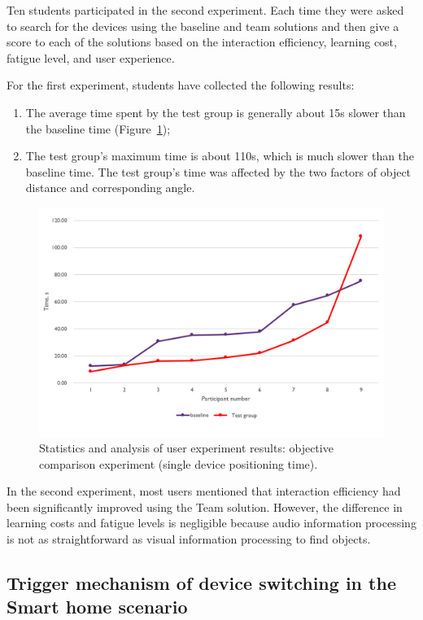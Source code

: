 Ten students participated in the second experiment. Each time they were asked to search for the devices using the baseline and team solutions and then give a score to each of the solutions based on the interaction efficiency, learning cost, fatigue level, and user experience. 

For the first experiment, students have collected the following results:
\begin{enumerate}
    \item The average time spent by the test group is generally about 15s slower than the baseline time (Figure~\ref{fig:Project1-figure});
    \item The test group's maximum time is about 110s, which is much slower than the baseline time. The test group's time was affected by the two factors of object distance and corresponding angle.
\end{enumerate}

\begin{figure}
  \centering
  \includegraphics[width=0.9\linewidth]{figures/Project_1.png}
  \caption{Statistics and analysis of user experiment results: objective comparison experiment (single device positioning time).}
  \label{fig:Project1-figure}
\end{figure}

In the second experiment, most users mentioned that interaction efficiency had been significantly improved using the Team solution. However, the difference in learning costs and fatigue levels is negligible because audio information processing is not as straightforward as visual information processing to find objects. 

\subsection{Trigger mechanism of device switching in the Smart home scenario}

